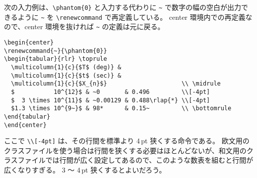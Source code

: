 次の入力例は、\verb`\phantom{0}` と入力する代わりに \verb`~` で数字の幅の空白が出力できるように \verb`~` を \verb`\renewcommand` で再定義している。
center 環境内での再定義なので、center 環境を抜ければ \verb`~` の定義は元に戻る。
\begin{mdframed}[roundcorner=0.50zw,leftmargin=3.00zw,rightmargin=3.00zw,skipabove=0.40zw,skipbelow=0.40zw,innertopmargin=4.00pt,innerbottommargin=4.00pt,innerleftmargin=5.00pt,innerrightmargin=5.00pt,linecolor=gray!020,linewidth=0.50pt,backgroundcolor=gray!20]
\begin{verbatim}
\begin{center}
\renewcommand{~}{\phantom{0}}
\begin{tabular}{rlr} \toprule
  \multicolumn{1}{c}{$T$ (deg)} &
  \multicolumn{1}{c}{$t$ (sec)} &
  \multicolumn{1}{c}{$X_{n}$}                     \\ \midrule
  $           10^{12}$ & ~0       & 0.496         \\[-4pt]
  $  3 \times 10^{11}$ & ~0.00129 & 0.488\rlap{*} \\[-4pt]
  $1.3 \times 10^{9~}$ & 98*      & 0.15~         \\ \bottomrule
\end{tabular}
\end{center}
\end{verbatim}
\end{mdframed}
ここで \verb`\\[-4pt]` は、その行間を標準より 4\,pt 狭くする命令である。
欧文用のクラスファイルを使う場合は行間を狭くする必要はほとんどないが、和文用のクラスファイルでは行間が広く設定してあるので、このような数表を組むと行間が広くなりすぎる。
3 ～ 4\,pt 狭くするとよいだろう。
